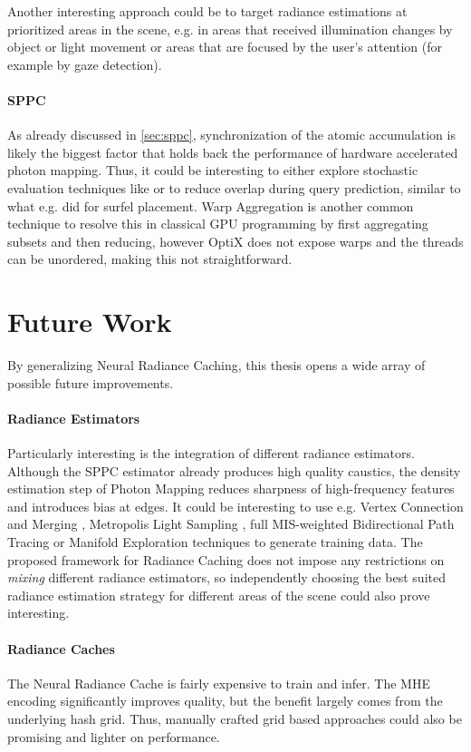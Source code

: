 Another interesting approach could be to target radiance estimations at prioritized areas in the scene, e.g. in areas that received illumination changes by object or light movement or areas that are focused by the user's attention (for example by gaze detection).

\paragraph{SPPC} As already discussed in \cref{sec:sppc}, synchronization of the atomic accumulation is likely the biggest factor that holds back the performance of hardware accelerated photon mapping.
Thus, it could be interesting to either explore stochastic evaluation techniques like \textcite{kern2023} or to reduce overlap during query prediction, similar to what e.g. \textcite{stachowiak2018} did for surfel placement.
Warp Aggregation is another common technique to resolve this in classical GPU programming by first aggregating subsets and then reducing, however OptiX does not expose warps and the threads can be unordered, making this not straightforward.

\section{Future Work}
By generalizing Neural Radiance Caching, this thesis opens a wide array of possible future improvements.

\paragraph{Radiance Estimators}
Particularly interesting is the integration of different radiance estimators.
Although the SPPC estimator already produces high quality caustics, the density estimation step of Photon Mapping reduces sharpness of high-frequency features and introduces bias at edges.
It could be interesting to use e.g. Vertex Connection and Merging \parencite{georgiev2012}, Metropolis Light Sampling \parencite{veach1997a}, full MIS-weighted Bidirectional Path Tracing \parencite{lafortune1993,veach1997} or Manifold Exploration techniques \parencite{jakob2012} to generate training data.
The proposed framework for Radiance Caching does not impose any restrictions on \emph{mixing} different radiance estimators, so independently choosing the best suited radiance estimation strategy for different areas of the scene could also prove interesting.

\paragraph{Radiance Caches}
The Neural Radiance Cache is fairly expensive to train and infer.
The MHE encoding significantly improves quality, but the benefit largely comes from the underlying hash grid.
Thus, manually crafted grid based approaches could also be promising and lighter on performance.

